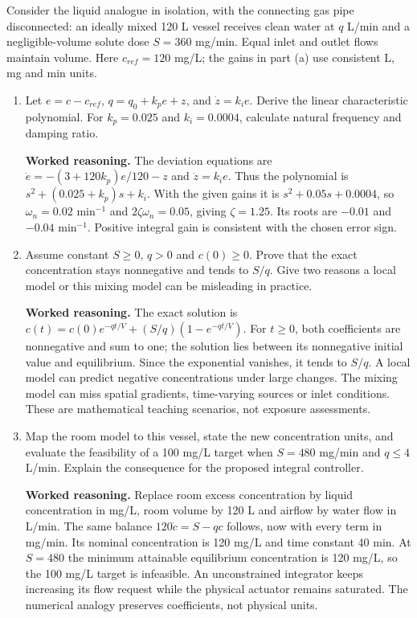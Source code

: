 \documentclass[10pt,a4paper]{article}
\newcommand{\task}[2]{\par\medskip{\color{ink}\Large\bfseries #1. #2}\par\smallskip}
\newcommand{\answer}{\par\smallskip\textbf{Worked reasoning.} }
\begin{document}
\newpage
\task{5}{The same balance in a stirred dilution vessel}
Consider the liquid analogue in isolation, with the connecting gas pipe disconnected: an ideally mixed 120 L vessel receives clean water at $q$ L/min and a negligible-volume solute dose $S=360$ mg/min. Equal inlet and outlet flows maintain volume. Here $c_{ref}=120$ mg/L; the gains in part (a) use consistent L, mg and min units.
\begin{enumerate}
\item Let $e=c-c_{ref}$, $q=q_0+k_p e+z$, and $\dot z=k_i e$. Derive the linear characteristic polynomial. For $k_p=0.025$ and $k_i=0.0004$, calculate natural frequency and damping ratio.
\answer The deviation equations are $\dot e=-(3+120k_p)e/120-z$ and $\dot z=k_i e$. Thus the polynomial is $s^2+(0.025+k_p)s+k_i$. With the given gains it is $s^2+0.05s+0.0004$, so $\omega_n=0.02$ min$^{-1}$ and $2\zeta\omega_n=0.05$, giving $\zeta=1.25$. Its roots are $-0.01$ and $-0.04$ min$^{-1}$. Positive integral gain is consistent with the chosen error sign.
\item Assume constant $S\ge0$, $q>0$ and $c(0)\ge0$. Prove that the exact concentration stays nonnegative and tends to $S/q$. Give two reasons a local model or this mixing model can be misleading in practice.
\answer The exact solution is $c(t)=c(0)e^{-qt/V}+(S/q)(1-e^{-qt/V})$. For $t\ge0$, both coefficients are nonnegative and sum to one; the solution lies between its nonnegative initial value and equilibrium. Since the exponential vanishes, it tends to $S/q$. A local model can predict negative concentrations under large changes. The mixing model can miss spatial gradients, time-varying sources or inlet conditions. These are mathematical teaching scenarios, not exposure assessments.
\item Map the room model to this vessel, state the new concentration units, and evaluate the feasibility of a 100 mg/L target when $S=480$ mg/min and $q\le4$ L/min. Explain the consequence for the proposed integral controller.
\answer Replace room excess concentration by liquid concentration in mg/L, room volume by 120 L and airflow by water flow in L/min. The same balance $120\dot c=S-qc$ follows, now with every term in mg/min. Its nominal concentration is 120 mg/L and time constant 40 min. At $S=480$ the minimum attainable equilibrium concentration is 120 mg/L, so the 100 mg/L target is infeasible. An unconstrained integrator keeps increasing its flow request while the physical actuator remains saturated. The numerical analogy preserves coefficients, not physical units.
\end{enumerate}
\end{document}
